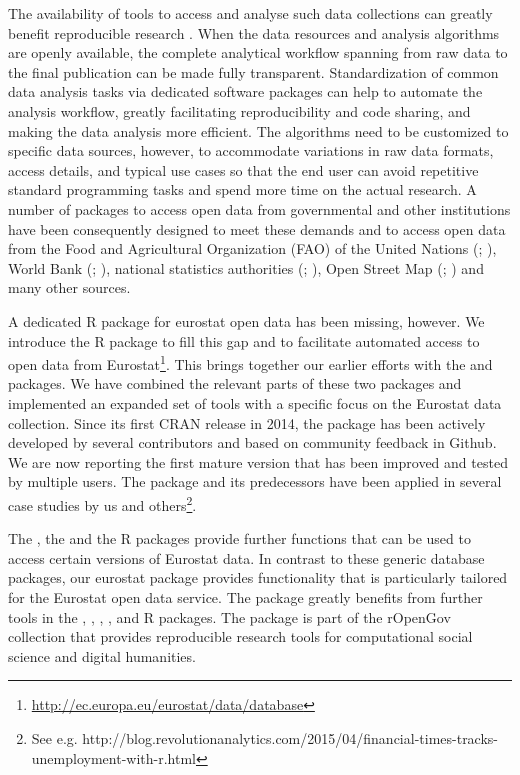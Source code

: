 The availability of tools to access and analyse such data collections
can greatly benefit reproducible research \citep{Gandrud13,
Boettiger2015}. When the data resources and analysis algorithms are
openly available, the complete analytical workflow spanning from raw
data to the final publication can be made fully
transparent. Standardization of common data analysis tasks via
dedicated software packages can help to automate the analysis
workflow, greatly facilitating reproducibility and code sharing, and
making the data analysis more efficient. The algorithms need to be
customized to specific data sources, however, to accommodate
variations in raw data formats, access details, and typical use cases
so that the end user can avoid repetitive standard programming tasks
and spend more time on the actual research. A number of packages to
access open data from governmental and other institutions have been
consequently designed to meet these demands and to access open data
from the Food and Agricultural Organization (FAO) of the United
Nations (; \cite{FAOSTAT}), World Bank
(; \cite{WDI}), national statistics authorities
(; \cite{pxweb}), Open Street Map
(; \cite{osmar}) and many other sources.

A dedicated R package for eurostat open data has been missing,
however. We introduce the  R package to fill this
gap and to facilitate automated access to open data from
Eurostat\footnote{\url{http://ec.europa.eu/eurostat/data/database}}.
This brings together our earlier efforts with
the  \citep{statfi} and 
\citep{smarterpoland} packages. We have combined the
relevant parts of these two packages and implemented an expanded set
of tools with a specific focus on the Eurostat data collection. Since
its first CRAN release in 2014, the package has been actively
developed by several contributors and based on community feedback in
Github. We are now reporting the first mature version that has been
improved and tested by multiple users. The package and its
predecessors have been applied in several case studies by us and
others\footnote{See
e.g. http://blog.revolutionanalytics.com/2015/04/financial-times-tracks-unemployment-with-r.html}.

The  \citep{datamart}, the  \citep{quandl} and
the  \citep{pdfetch} 
R packages provide further functions that can be used to access
certain versions of Eurostat data. In contrast to these generic
database packages, our eurostat package provides functionality that is
particularly tailored for the Eurostat open data service.
The  package greatly benefits from further tools in
the
 \citep{dplyr},
 \citep{knitr},  \citep{ggplot2},
 \citep{mapproj}, and
 \citep{stringi} R packages. The  package is
part of the rOpenGov collection
\citep{Lahti13icml} that provides reproducible research tools for
computational social science and digital humanities.

